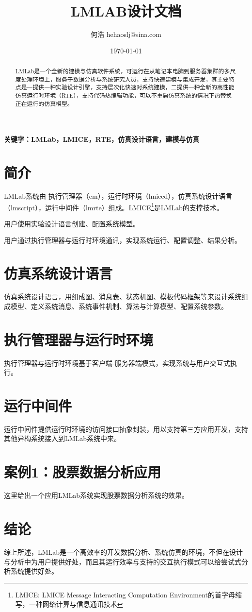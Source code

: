 \documentclass[UTF8, 10pt, a4paper]{ctexart}
\title{LMLAB设计文档}
\author{何浩 hehaoslj@sina.com}
\date{\today}
\begin{document}
\maketitle

\begin{abstract}

LMLab是一个全新的建模与仿真软件系统，可运行在从笔记本电脑到服务器集群的多尺度处理环境上，服务于数据分析与系统研究人员，支持快速建模与集成开发，其主要特点是一提供一种实验设计引擎，支持层次化快速对系统建模，二提供一种全新的高性能仿真运行时环境（RTE），支持代码热编辑功能，可以不重启仿真系统的情况下热替换正在运行的仿真模型。

\end{abstract}

\textbf{\normalsize 关键字：LMLab，LMICE，RTE，仿真设计语言，建模与仿真}


\tableofcontents

\section {简介}


LMLab系统由 执行管理器（em），运行时环境（lmiced），仿真系统设计语言（lmscript），运行中间件（lmrte）组成。LMICE\footnote{LMICE: LMICE Message Interacting Computation Environment的首字母缩写，一种网络计算与信息通讯技术}是LMLab的支撑技术。

用户使用实验设计语言创建、配置系统模型。

用户通过执行管理器与运行时环境通讯，实现系统运行、配置调整、结果分析。

\section{仿真系统设计语言}

仿真系统设计语言，用组成图、消息表、状态机图、模板代码框架等来设计系统组成模型、定义系统消息、系统事件机制、算法与计算模型、配置系统参数。

\section{执行管理器与运行时环境}

执行管理器与运行时环境基于客户端-服务器端模式，实现系统与用户交互式执行。

\section{运行中间件}

运行中间件提供运行时环境的访问接口抽象封装，用以支持第三方应用开发，支持其他异构系统接入到LMLab系统中来。

\section{案例1：股票数据分析应用}

这里给出一个应用LMLab系统实现股票数据分析系统的效果。

\section{结论}

综上所述，LMLab是一个高效率的开发数据分析、系统仿真的环境，不但在设计与分析中为用户提供好处，而且其运行效率与支持的交互执行模式可以给尝试式分析系统提供好处。
\end{document}
